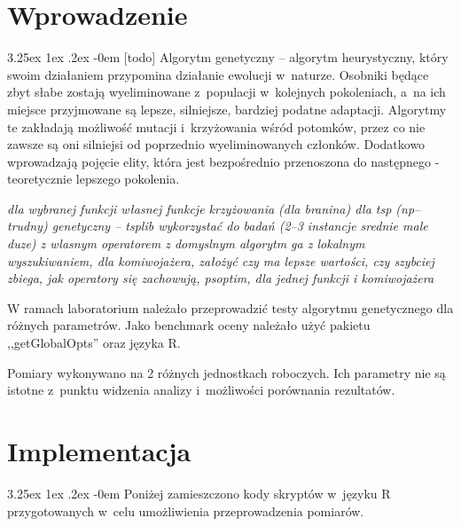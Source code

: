 \documentclass[11pt, a4paper]{article}
\date{\today}
\makeatletter
\newcommand{\fbi}{\leavevmode{\parindent=1em\indent}}
\renewcommand\paragraph{\@startsection{paragraph}{5}{\z@}
  {3.25ex \@plus1ex \@minus.2ex}
  {-0em}
  {\normalfont\normalsize\bfseries}}
\makeatother
\begin{document}


\tableofcontents

\newpage
\section{Wprowadzenie}
\paragraph{}
[todo]
Algorytm genetyczny – algorytm heurystyczny, który swoim działaniem przypomina działanie ewolucji w~naturze. Osobniki będące zbyt słabe zostają wyeliminowane z~populacji w~kolejnych pokoleniach, a~na ich miejsce przyjmowane są lepsze, silniejsze, bardziej podatne adaptacji. Algorytmy te zakładają możliwość mutacji i~krzyżowania wśród potomków, przez co nie zawsze są oni silniejsi od poprzednio wyeliminowanych członków. Dodatkowo wprowadzają pojęcie elity, która jest bezpośrednio przenoszona do następnego - teoretycznie lepszego pokolenia.



\textit{dla wybranej funkcji własnej funkcje krzyżowania (dla branina)
dla tsp (np--trudny) genetyczny -- tsplib wykorzystać do badań (2--3 instancje srednie male duze) z wlasnym operatorem z domyslnym
algorytm ga z lokalnym wyszukiwaniem, dla komiwojażera, założyć czy ma lepsze wartości, czy szybciej zbiega, jak operatory się zachowują,
psoptim, dla jednej funkcji i komiwojażera}



\fbi
W ramach laboratorium należało przeprowadzić testy algorytmu genetycznego dla różnych parametrów. Jako benchmark oceny należało użyć pakietu ,,getGlobalOpts'' oraz języka R.

\fbi
Pomiary wykonywano na 2 różnych jednostkach roboczych. Ich parametry nie są istotne z~punktu widzenia analizy i~możliwości porównania rezultatów.



\section{Implementacja}
\paragraph{}
Poniżej zamieszczono kody skryptów w~języku R przygotowanych w~celu umożliwienia przeprowadzenia pomiarów.


\end{document}
